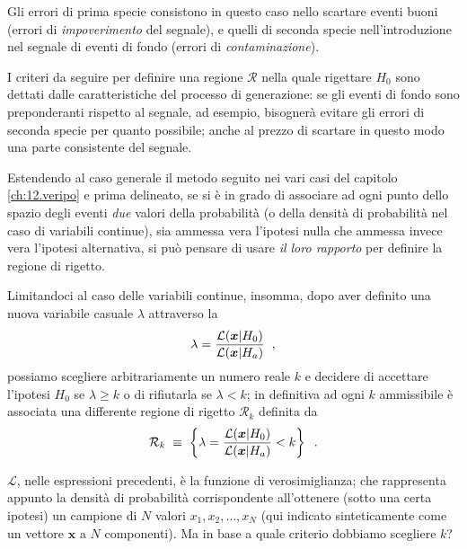 Gli errori di prima specie consistono in questo caso nello
scartare eventi buoni (errori di \emph{impoverimento} del
segnale), e quelli di seconda specie nell'introduzione nel
segnale di eventi di fondo (errori di
\emph{contaminazione}).

I criteri da seguire per definire una regione $\mathcal{R}$
nella quale rigettare $H_0$ sono dettati dalle
caratteristiche del processo di generazione: se gli eventi
di fondo sono preponderanti rispetto al segnale, ad esempio,
bisogner\`a evitare gli errori di seconda specie per quanto
possibile; anche al prezzo di scartare in questo modo una
parte consistente del segnale.

Estendendo al caso generale il metodo seguito nei vari casi
del capitolo \ref{ch:12.veripo} e prima delineato, se si \`e
in grado di associare ad ogni punto dello spazio degli
eventi \emph{due} valori della probabilit\`a (o della
densit\`a di probabilit\`a nel caso di variabili continue),
sia ammessa vera l'ipotesi nulla che ammessa invece vera
l'ipotesi alternativa, si pu\`o pensare di usare \emph{il
  loro rapporto} per definire la regione di rigetto.

Limitandoci al caso delle variabili continue, insomma, dopo
aver definito una nuova variabile casuale $\lambda$
attraverso la
\begin{equation*}
  \lambda = \frac{\mathcal{L} (\boldsymbol{x} |
    H_0)}{\mathcal{L} (\boldsymbol{x} | H_a)} \;\; ,
\end{equation*}
possiamo scegliere arbitrariamente un numero reale $k$ e
decidere di accettare l'ipotesi $H_0$ se $\lambda \ge k$ o
di rifiutarla se $\lambda < k$; in definitiva ad ogni $k$
ammissibile \`e associata una differente regione di rigetto
$\mathcal{R}_k$ definita da
\begin{equation*}
  \mathcal{R}_k \; \equiv \; \left\{ \lambda =
    \frac{\mathcal{L} (\boldsymbol{x} | H_0)}{\mathcal{L}
    (\boldsymbol{x} | H_a)} < k \right\} \;\; .
\end{equation*}

$\mathcal{L}$, nelle espressioni precedenti, \`e la funzione
di verosimiglianza;%
che rappresenta appunto la densit\`a di probabilit\`a
corrispondente all'ottenere (sotto una certa ipotesi) un
campione di $N$ valori $x_1, x_2,\ldots,x_N$ (qui indicato
sinteticamente come un vettore $\boldsymbol{x}$ a $N$
componenti).  Ma in base a quale criterio dobbiamo scegliere
$k$?

